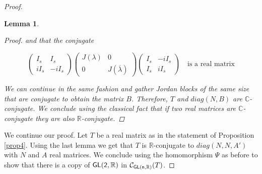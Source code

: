 \documentclass[10pt,a4paper]{amsart}
\newtheorem{lemma}{Lemma}
\newcommand{\C}{\mathcal C}
\def \GL{\sf{GL}}
\newcommand{\R}{\mathbb R}
\begin{document}
\begin{proof}
\begin{lemma}
\begin{proof}
and that the conjugate

$$\begin{pmatrix}
I_s & I_s \\
iI_s & -iI_s  
\end{pmatrix}
\begin{pmatrix}
J(\lambda) & 0 \\
0 & J(\overline{\lambda})  
\end{pmatrix}
\begin{pmatrix}
I_s & -iI_s \\
I_s & iI_s  
\end{pmatrix} \quad \text{is a real matrix}$$

We can continue in the same fashion and gather Jordan blocks of the same size that are conjugate to obtain the matrix $B$. Therefore, $T$ and $diag(N,B)$ are $\mathbb{C}$-conjugate. We conclude using the classical fact that if two real matrices are $\mathbb{C}$-conjugate they are also $\R$-conjugate.

\end{proof}
    
\end{lemma}


We continue our proof. Let $T$ be a real matrix as in the statement of Proposition \ref{prop4}.  Using the last lemma we get that $T$ is $\R$-conjugate to $diag(N,N,A')$ with $N$ and $A$ real matrices. We conclude using the homomorphism $\Psi$ as before to show that there is a copy of $\GL(2,\R)$ in $\C_{\GL(n,\R)}(T)$.

\end{proof}                                   
\end{document}
